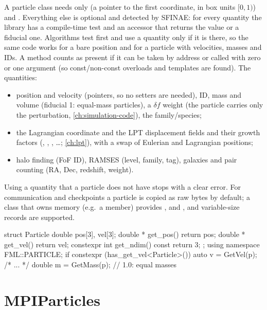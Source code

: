 A particle class needs only  (a pointer to the first coordinate, in box units $[0,1)$) and
. Everything else is optional and detected by SFINAE: for every quantity the library has a compile-time
test  and an accessor  that returns the value or a fiducial one.
Algorithms test first and use a quantity only if it is there, so the same code works for a bare position and for a
particle with velocities, masses and IDs. A method counts as present if it can be taken by address or called with zero or
one argument (so const/non-const overloads and templates are found). The quantities:
\begin{itemize}
\item position and velocity (pointers, so no setters are needed), ID, mass and volume (fiducial 1: equal-mass particles),
      a $\delta f$ weight (the particle carries only the perturbation, \cref{ch:simulation-code}), the family/species;
\item the Lagrangian coordinate and the LPT displacement fields and their growth factors (,
      , , \ldots; \cref{ch:lpt}), with a swap of Eulerian and Lagrangian positions;
\item halo finding (FoF ID), RAMSES (level, family, tag), galaxies and pair counting (RA, Dec, redshift, weight).
\end{itemize}
Using a quantity that a particle does not have stops with a clear error. For communication and checkpoints a particle is
copied as raw bytes by default; a class that owns memory (e.g.\ a  member) provides
,  and , and variable-size records are
supported.

\begin{cppcode}
struct Particle {
    double pos[3], vel[3];
    double * get_pos() { return pos; }
    double * get_vel() { return vel; }
    constexpr int get_ndim() const { return 3; }
};
using namespace FML::PARTICLE;
if constexpr (has_get_vel<Particle>()) { auto v = GetVel(p); /* ... */ }
double m = GetMass(p);                      // 1.0: equal masses
\end{cppcode}

\section{MPIParticles}\label{sec:part-mpiparticles}

